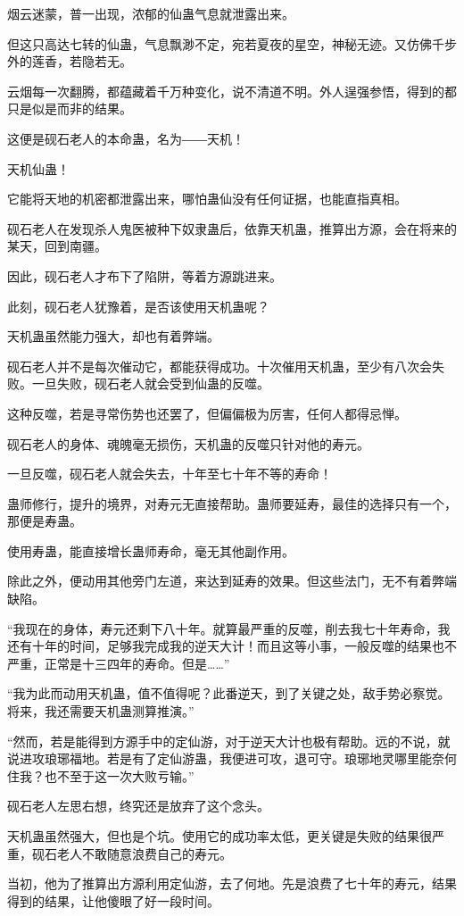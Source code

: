 \begin{this_body}
烟云迷蒙，普一出现，浓郁的仙蛊气息就泄露出来。

但这只高达七转的仙蛊，气息飘渺不定，宛若夏夜的星空，神秘无迹。又仿佛千步外的莲香，若隐若无。

云烟每一次翻腾，都蕴藏着千万种变化，说不清道不明。外人逞强参悟，得到的都只是似是而非的结果。

这便是砚石老人的本命蛊，名为――天机！

天机仙蛊！

它能将天地的机密都泄露出来，哪怕蛊仙没有任何证据，也能直指真相。

砚石老人在发现杀人鬼医被种下奴隶蛊后，依靠天机蛊，推算出方源，会在将来的某天，回到南疆。

因此，砚石老人才布下了陷阱，等着方源跳进来。

此刻，砚石老人犹豫着，是否该使用天机蛊呢？

天机蛊虽然能力强大，却也有着弊端。

砚石老人并不是每次催动它，都能获得成功。十次催用天机蛊，至少有八次会失败。一旦失败，砚石老人就会受到仙蛊的反噬。

这种反噬，若是寻常伤势也还罢了，但偏偏极为厉害，任何人都得忌惮。

砚石老人的身体、魂魄毫无损伤，天机蛊的反噬只针对他的寿元。

一旦反噬，砚石老人就会失去，十年至七十年不等的寿命！

蛊师修行，提升的境界，对寿元无直接帮助。蛊师要延寿，最佳的选择只有一个，那便是寿蛊。

使用寿蛊，能直接增长蛊师寿命，毫无其他副作用。

除此之外，便动用其他旁门左道，来达到延寿的效果。但这些法门，无不有着弊端缺陷。

“我现在的身体，寿元还剩下八十年。就算最严重的反噬，削去我七十年寿命，我还有十年的时间，足够我完成我的逆天大计！而且这等小事，一般反噬的结果也不严重，正常是十三四年的寿命。但是……”

“我为此而动用天机蛊，值不值得呢？此番逆天，到了关键之处，敌手势必察觉。将来，我还需要天机蛊测算推演。”

“然而，若是能得到方源手中的定仙游，对于逆天大计也极有帮助。远的不说，就说进攻琅琊福地。若是有了定仙游蛊，我便进可攻，退可守。琅琊地灵哪里能奈何住我？也不至于这一次大败亏输。”

砚石老人左思右想，终究还是放弃了这个念头。

天机蛊虽然强大，但也是个坑。使用它的成功率太低，更关键是失败的结果很严重，砚石老人不敢随意浪费自己的寿元。

当初，他为了推算出方源利用定仙游，去了何地。先是浪费了七十年的寿元，结果得到的结果，让他傻眼了好一段时间。


\end{this_body}
